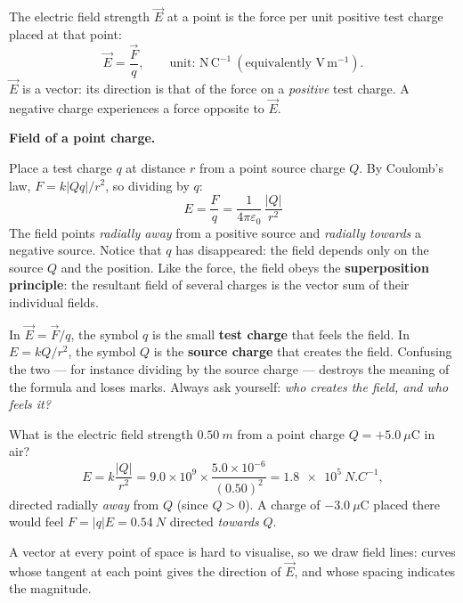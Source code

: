 \documentclass[11pt]{article}
\newcommand{\cle}[1]{{\popxbold\color{popdark}#1}}
\newcounter{popsec}
\newcounter{popsub}
\newcommand{\courssub}[1]{%
  \stepcounter{popsub}%
  \par\vspace{9pt}\noindent{\popxbold\fontsize{11.5}{13}\selectfont\color{popink}{\color{poporange}\thepopsec.\thepopsub}\hspace{6pt}#1}\par\nopagebreak\vspace{4pt}
}
\begin{document}
\begin{definition}
The \cle{electric field strength} $\vec{E}$ at a point is the force per unit positive test charge placed at that point:
\[
\vec{E}=\frac{\vec{F}}{q},\qquad\text{unit: }\mathrm{N\,C^{-1}}\ (\text{equivalently } \mathrm{V\,m^{-1}}).
\]
$\vec{E}$ is a vector: its direction is that of the force on a \emph{positive} test charge. A negative charge experiences a force opposite to $\vec{E}$.
\end{definition}

\textbf{Field of a point charge.}\par
Place a test charge $q$ at distance $r$ from a point source charge $Q$. By Coulomb's law, $F=k|Qq|/r^2$, so dividing by $q$:
\[
\boxed{\,E=\frac{F}{q}=\frac{1}{4\pi\varepsilon_0}\,\frac{|Q|}{r^2}\,}
\]
The field points \emph{radially away} from a positive source and \emph{radially towards} a negative source. Notice that $q$ has disappeared: the field depends only on the source $Q$ and the position. Like the force, the field obeys the \textbf{superposition principle}: the resultant field of several charges is the vector sum of their individual fields.

\begin{attention}
In $\vec{E}=\vec{F}/q$, the symbol $q$ is the small \textbf{test charge} that feels the field. In $E=kQ/r^2$, the symbol $Q$ is the \textbf{source charge} that creates the field. Confusing the two — for instance dividing by the source charge — destroys the meaning of the formula and loses marks. Always ask yourself: \emph{who creates the field, and who feels it?}
\end{attention}

\begin{exemplebox}
What is the electric field strength $\SI{0.50}{m}$ from a point charge $Q=+5.0\ \mu\mathrm{C}$ in air?
\[
E=k\frac{|Q|}{r^2}=9.0\times10^{9}\times\frac{5.0\times10^{-6}}{(0.50)^2}
=\SI{1.8e5}{N.C^{-1}},
\]
directed radially \emph{away} from $Q$ (since $Q>0$). A charge of $-3.0\ \mu\mathrm{C}$ placed there would feel $F=|q|E=\SI{0.54}{N}$ directed \emph{towards} $Q$.
\end{exemplebox}

\courssub{Electric Field Lines}

A vector at every point of space is hard to visualise, so we draw \cle{field lines}: curves whose tangent at each point gives the direction of $\vec{E}$, and whose spacing indicates the magnitude.
\end{document}
